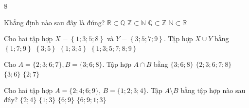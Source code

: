 \begin{indapan}{8}
\begin{ex}%
	Khẳng định nào sau đây là đúng?
	\choice
	{$ \mathbb{R}\subset\mathbb{Q} $}
	{$ \mathbb{Z}\subset\mathbb{N} $}
	{$ \mathbb{Q}\subset\mathbb{Z} $}
	{\True $ \mathbb{N}\subset\mathbb{R} $}
\end{ex}
\begin{ex}%
	Cho hai tập hợp $X=\left\{1;3;5;8\right\}$ và $Y=\left\{3;5;7;9\right\}$. Tập hợp $X\cup Y$ bằng
	\choice
	{$\left\{1;7;9\right\}$}
	{$\left\{3;5\right\}$}
	{$\left\{1;3;5\right\}$}
	{\True $\left\{1;3;5;7;8;9\right\}$}
\end{ex}
\begin{ex}%
	Cho $A=\{2;3;6;7\}, B=\{3;6;8\}$. Tập hợp $A\cap B$ bằng
	\choice
	{$\{3;6;8\}$}
	{$\{2;3;6;7;8\}$}
	{\True $\{3;6\}$}
	{$\{2;7\}$}
\end{ex}
\begin{ex}%
	Cho hai tập hợp $A=\{2;4;6;9\}$, $B=\{1;2;3;4\}$. Tập $A \setminus B$ bằng tập hợp nào sau đây?
	\choice
	{$\{2;4\}$}
	{$\{1;3\}$}
	{\True $\{6;9\}$}
	{$\{6;9;1;3\}$}
\end{ex}


\end{indapan}
